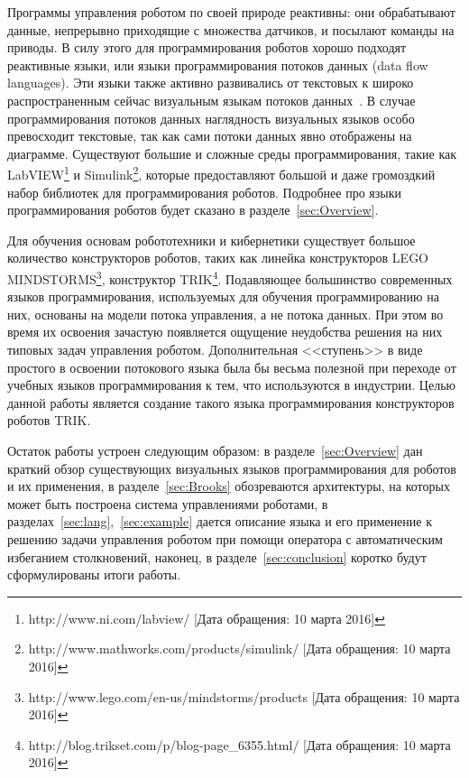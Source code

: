 \documentclass[conference]{IEEEtran}
\begin{document}
Программы управления роботом по своей природе реактивны: они обрабатывают данные, непрерывно приходящие с множества датчиков, и посылают команды на приводы. В силу этого для программирования роботов хорошо подходят реактивные языки, или языки программирования потоков данных (data flow languages). Эти языки также активно развивались от текстовых к широко распространенным сейчас визуальным языкам потоков данных~\cite{johnston2004advances}. В случае программирования потоков данных наглядность визуальных языков особо превосходит текстовые, так как сами потоки данных явно отображены на диаграмме. Существуют большие и сложные среды программирования, такие как LabVIEW\footnote{http://www.ni.com/labview/ [Дата обращения: 10 марта 2016]} и Simulink\footnote{http://www.mathworks.com/products/simulink/ [Дата обращения: 10 марта 2016]}, которые предоставляют большой и даже громоздкий набор библиотек для программирования роботов. Подробнее про языки программирования роботов будет сказано в разделе~\ref{sec:Overview}.

Для обучения основам робототехники и кибернетики существует большое количество конструкторов роботов, таких как линейка конструкторов LEGO MINDSTORMS\footnote{http://www.lego.com/en-us/mindstorms/products [Дата обращения: 10 марта 2016]}, конструктор TRIK\footnote{http://blog.trikset.com/p/blog-page\_6355.html/ [Дата обращения: 10 марта 2016]}.
Подавляющее большинство современных языков программирования, используемых для обучения программированию на них, основаны на модели потока управления, а не потока данных. При этом во время их освоения зачастую появляется ощущение неудобства решения на них типовых задач управления роботом. Дополнительная <<ступень>> в виде простого в освоении потокового языка была бы весьма полезной при переходе от учебных языков программирования к тем, что используются в индустрии. Целью данной работы является создание такого языка программирования конструкторов роботов TRIK.


Остаток работы устроен следующим образом: в разделе~\ref{sec:Overview} дан краткий обзор существующих визуальных языков программирования для роботов и их применения, в разделе~\ref{sec:Brooks} обозреваются архитектуры, на которых может быть построена система управлениями роботами, в разделах~\ref{sec:lang},~\ref{sec:example} дается описание языка и его применение к решению задачи управления роботом при помощи оператора с автоматическим избеганием столкновений, наконец, в разделе~\ref{sec:conclusion} коротко будут сформулированы итоги работы. 
\end{document}

